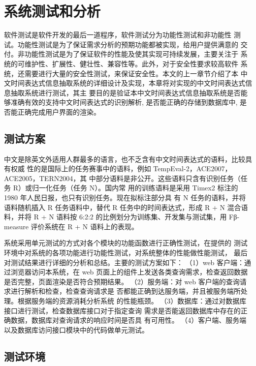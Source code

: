 
\chapter{系统测试和分析}

软件测试是软件开发的最后一道程序，软件测试分为功能性测试和非功能性
测试。功能性测试是为了保证需求分析的预期功能都被实现，给用户提供满意的
交付。非功能性测试是为了保证软件的性能及使其实现可持续发展，主要关注于
系统的可维护性、扩展性、健壮性、兼容性等。此外，对于安全性要求较高软件
系统，还需要进行大量的安全性测试，来保证安全性。本文的上一章节介绍了本
中文时间表达式信息抽取系统的详细设计及实现，本章将对实现的中文时间表达式信息抽取系统进行测试，其主
要目的是验证本中文时间表达式信息抽取系统是否能够准确有效的支持中文时间表达式的识别解析, 是否能正确的存储到数据库中, 是否能正确完成用户界面的渲染。

\section{测试方案}

中文是除英文外适用人群最多的语言，也不乏含有中文时间表达式的语料，比较具有权威
性的是国际上的任务赛事中的语料，例如 TempEval-2，ACE2007，ACE2005，TERN2004，其
中部分语料是非公开。这些语料只含有识别任务（任务 R）或归一化任务（任务 N）。国内常
用的训练语料是采用 Timex2 标注的 1980 年人民日报，也只有识别任务。现在拟标注部分具
有 N 任务的语料，并将语料随机插入 R 任务语料中，替代 R 任务中的时间表达式，形成 R +
N 混合语料，并将 R + N 语料按 6:2:2 的比例划分为训练集、开发集与测试集，用 Fβ-measure
评价系统在 R + N 语料上的表现。

系统采用单元测试的方式对各个模块的功能函数进行正确性测试，在提供的
测试环境中对系统的各项功能进行功能性测试，对系统整体的性能做性能测试，
最后对测试结果进行详细的分析和总结。主要的测试方案如下：
（1）web 客户端：通过浏览器访问本系统，在 web 页面上的组件上发送各类查询需求，检查返回数据是否完整，页面渲染是否符合预期结果。
（2）服务端：对 web 客户端的查询请求进行解析和检查，检查查询请求是
否都能正确到达服务端，并且被服务端所处理。根据服务端的资源消耗分析系统
的性能瓶颈。
（3）数据库：通过对数据库接口进行测试，检查数据库接口对于指定查询
需求是否能返回数据库中存在的正确数据，数据库对查询请求的响应时间是否具
有可用性。
（4）客户端、服务端以及数据库访问接口模块中的代码做单元测试。

\section{测试环境}


